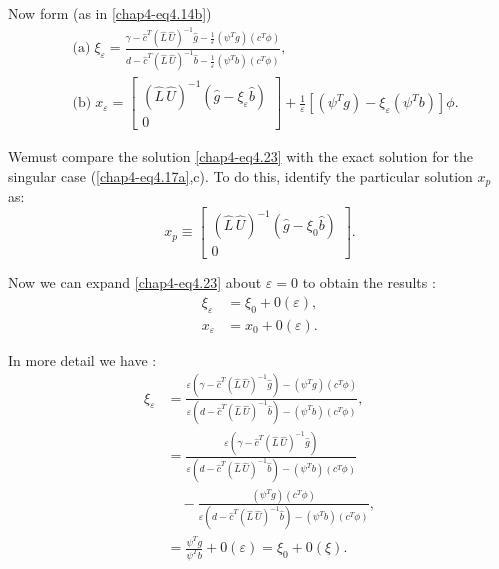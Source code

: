 Now form (as in \eqref{chap4-eq4.14b})
\begin{equation*}
\begin{split}
& \text{(a)}   \; \xi_\varepsilon   = \frac{\gamma-\hat{c}^T
  (\hat{L} \, \hat{U})^{-1}\hat{g}- \frac{1}{\varepsilon
  }(\psi ^T g)(c^T \phi)}{d-\hat{c}^T
  (\hat{L} \, \hat{U})^{-1}\hat{b}- \frac{1}{\varepsilon }
  (\psi ^T b)(c^T \phi)},\\  
&\text{(b)} \;  x_\varepsilon   = 
\begin{bmatrix}
(\hat{L} \, \hat{U})^{-1}(\hat{g}- \xi _\varepsilon
  \hat{b})\\ 
0
\end{bmatrix}
+ \frac{1}{\varepsilon } [(\psi ^T g)- \xi _\varepsilon  (\psi ^T b)]
\phi . 
\end{split}\tag{4.23}\label{chap4-eq4.23}
\end{equation*}

 We\pageoriginale must compare the solution \eqref{chap4-eq4.23} with
 the exact  solution for the 
 singular case (\ref{chap4-eq4.17a},c). To do this, identify the
 particular  solution $x_p$ as:	 
 $$
  x_p \equiv
 \begin{bmatrix}
(\hat{L} \, \hat{U})^{-1}(\hat{g}- \xi _0 \hat{b})\\
0
\end{bmatrix}.
 $$
 
 Now we can expand \eqref{chap4-eq4.23} about $\varepsilon  = 0$ to
 obtain the results :  
  \begin{align*}
\xi_\varepsilon  & = \xi_0 + 0(\varepsilon),\\
x_\varepsilon  &= x_0 + 0 (\varepsilon).
 \end{align*} 
 
In more detail we have :
\begin{align*}
\xi_\varepsilon  & = \frac{ \varepsilon
  (\gamma-\hat{c}^T(\hat{L} \, \hat{U})^{-1}\hat{g} )-
  (\psi ^T g)(c^T \phi)}{\varepsilon
  (d-\hat{c}^T(\hat{L} \, \hat{U})^{-1}\hat{b})-( \psi ^T
  b) (c^T  \phi)},\\[3pt] 
  & = \frac{ \varepsilon
  (\gamma-\hat{c}^T(\hat{L} \, \hat{U})^{-1}\hat{g}
  )}{\varepsilon
  (d-\hat{c}^T(\hat{L} \, \hat{U})^{-1}\hat{b})-( \psi ^T
  b) (c^T  \phi)}\\
&\quad - \frac{  (\psi ^T g)(c^T \phi)}{\varepsilon
  (d-\hat{c}^T(\hat{L} \, \hat{U})^{-1}\hat{b})-( \psi ^T
  b) (c^T  \phi)},\\[3pt]  
 & =  \frac{\psi ^T g}{\psi ^T b}+ 0(\varepsilon ) = \xi _0 +0 (\xi).
 \end{align*} 

